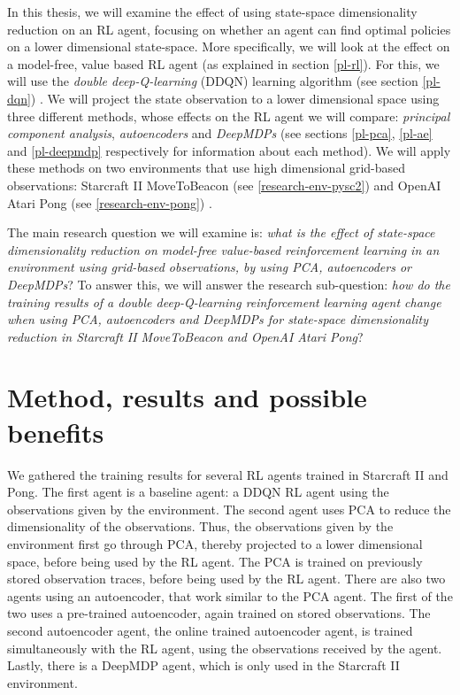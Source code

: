 In this thesis, we will examine the effect of using state-space dimensionality reduction on an RL agent, focusing on whether an agent can find optimal policies on a lower dimensional state-space. More specifically, we will look at the effect on a model-free, value based RL agent (as explained in section \ref{pl-rl}). For this, we will use the \emph{double deep-Q-learning} (DDQN) learning algorithm (see section \ref{pl-dqn}) \cite{ddqn}. We will project the state observation to a lower dimensional space using three different methods, whose effects on the RL agent we will compare: \emph{principal component analysis}, \emph{autoencoders} and \emph{DeepMDPs} (see sections \ref{pl-pca}, \ref{pl-ae} and \ref{pl-deepmdp} respectively for information about each method). We will apply these methods on two environments that use high dimensional grid-based observations: Starcraft II MoveToBeacon (see \ref{research-env-pysc2}) and OpenAI Atari Pong (see \ref{research-env-pong}) \cite{pysc2}\cite{pong}.

The main research question we will examine is: \textit{what is the effect of state-space dimensionality reduction on model-free value-based reinforcement learning in an environment using grid-based observations, by using PCA, autoencoders or DeepMDPs}? To answer this, we will answer the research sub-question: \textit{how do the training results of a double deep-Q-learning reinforcement learning agent change when using PCA, autoencoders and DeepMDPs for state-space dimensionality reduction in Starcraft II MoveToBeacon and OpenAI Atari Pong}?

\section{Method, results and possible benefits}
We gathered the training results for several RL agents trained in Starcraft II and Pong. The first agent is a baseline agent: a DDQN RL agent using the observations given by the environment. The second agent uses PCA to reduce the dimensionality of the observations. Thus, the observations given by the environment first go through PCA, thereby projected to a lower dimensional space, before being used by the RL agent. The PCA is trained on previously stored observation traces, before being used by the RL agent. There are also two agents using an autoencoder, that work similar to the PCA agent. The first of the two uses a pre-trained autoencoder, again trained on stored observations. The second autoencoder agent, the online trained autoencoder agent, is trained simultaneously with the RL agent, using the observations received by the agent. Lastly, there is a DeepMDP agent, which is only used in the Starcraft II environment.

